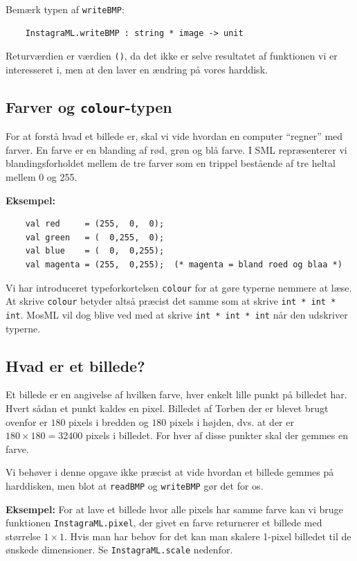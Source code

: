 \documentclass[a4paper,12pt]{article}
\begin{document}
Bemærk typen af \verb|writeBMP|:
\begin{lstlisting}
    InstagraML.writeBMP : string * image -> unit
\end{lstlisting}
Returværdien er værdien \verb|()|, da det ikke er selve resultatet af
funktionen vi er interesseret i, men at den laver en ændring på vores
harddisk.

\subsection*{Farver og \texttt{colour}-typen}
For at forstå hvad et billede er, skal vi vide hvordan en computer
"`regner"' med farver. En farve er en blanding af rød, grøn og blå
farve. I SML repræsenterer vi blandingsforholdet mellem de tre farver
som en trippel bestående af tre heltal mellem 0 og 255.

\noindent
\textbf{Eksempel:}
\begin{lstlisting}
    val red     = (255,  0,  0);
    val green   = (  0,255,  0);
    val blue    = (  0,  0,255);
    val magenta = (255,  0,255);  (* magenta = bland roed og blaa *)
\end{lstlisting}

Vi har introduceret typeforkortelsen \verb|colour| for at gøre typerne
nemmere at læse. At skrive \verb|colour| betyder altså præcist det
samme som at skrive \verb|int * int * int|. MosML vil dog blive ved
med at skrive \verb|int * int * int| når den udskriver typerne.

\subsection*{Hvad er et billede?}
Et billede er en angivelse af hvilken farve, hver enkelt lille punkt på
billedet har. Hvert sådan et punkt kaldes en pixel. Billedet af Torben
der er blevet brugt ovenfor er $180$ pixels i bredden og $180$ pixels
i højden, dvs. at der er $180 \times 180 = 32400$ pixels i
billedet. For hver af disse punkter skal der gemmes en farve.

Vi behøver i denne opgave ikke præcist at vide hvordan et billede
gemmes på harddisken, men blot at \verb|readBMP| og \verb|writeBMP|
gør det for os.

\noindent

\textbf{Eksempel:} For at lave et billede hvor alle pixels har samme
farve kan vi bruge funktionen \verb|InstagraML.pixel|, der givet en
farve returnerer et billede med størrelse $1 \times 1$. Hvis man har
behov for det kan man skalere 1-pixel billedet til de ønskede
dimensioner. Se \verb|InstagraML.scale| nedenfor.
\end{document}

